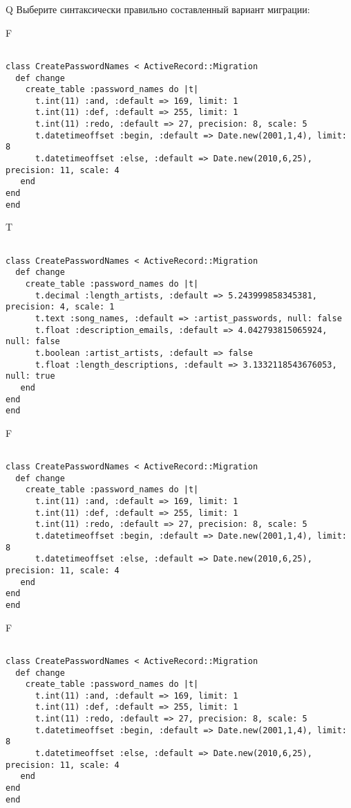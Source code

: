 Q
Выберите синтаксически правильно составленный вариант миграции:

F
\begin{verbatim}
		
class CreatePasswordNames < ActiveRecord::Migration 
  def change 
    create_table :password_names do |t| 
      t.int(11) :and, :default => 169, limit: 1
      t.int(11) :def, :default => 255, limit: 1
      t.int(11) :redo, :default => 27, precision: 8, scale: 5
      t.datetimeoffset :begin, :default => Date.new(2001,1,4), limit: 8
      t.datetimeoffset :else, :default => Date.new(2010,6,25), precision: 11, scale: 4
   end
end
end
\end{verbatim}

T
\begin{verbatim}
		
class CreatePasswordNames < ActiveRecord::Migration 
  def change 
    create_table :password_names do |t| 
      t.decimal :length_artists, :default => 5.243999858345381, precision: 4, scale: 1
      t.text :song_names, :default => :artist_passwords, null: false
      t.float :description_emails, :default => 4.042793815065924, null: false
      t.boolean :artist_artists, :default => false
      t.float :length_descriptions, :default => 3.1332118543676053, null: true
   end
end
end
\end{verbatim}

F
\begin{verbatim}
		
class CreatePasswordNames < ActiveRecord::Migration 
  def change 
    create_table :password_names do |t| 
      t.int(11) :and, :default => 169, limit: 1
      t.int(11) :def, :default => 255, limit: 1
      t.int(11) :redo, :default => 27, precision: 8, scale: 5
      t.datetimeoffset :begin, :default => Date.new(2001,1,4), limit: 8
      t.datetimeoffset :else, :default => Date.new(2010,6,25), precision: 11, scale: 4
   end
end
end
\end{verbatim}

F
\begin{verbatim}
		
class CreatePasswordNames < ActiveRecord::Migration 
  def change 
    create_table :password_names do |t| 
      t.int(11) :and, :default => 169, limit: 1
      t.int(11) :def, :default => 255, limit: 1
      t.int(11) :redo, :default => 27, precision: 8, scale: 5
      t.datetimeoffset :begin, :default => Date.new(2001,1,4), limit: 8
      t.datetimeoffset :else, :default => Date.new(2010,6,25), precision: 11, scale: 4
   end
end
end
\end{verbatim}

